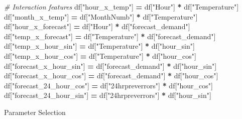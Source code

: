\documentclass[mstat,12pt]{unswthesis}
\newenvironment{Shaded}{\begin{snugshade}}{\end{snugshade}}
\newcommand{\CommentTok}[1]{\textcolor[rgb]{0.56,0.35,0.01}{\textit{#1}}}
\newcommand{\NormalTok}[1]{#1}
\newcommand{\OperatorTok}[1]{\textcolor[rgb]{0.81,0.36,0.00}{\textbf{#1}}}
\newcommand{\StringTok}[1]{\textcolor[rgb]{0.31,0.60,0.02}{#1}}
\begin{document}
\begin{Shaded}
\begin{Highlighting}[]
\CommentTok{\# Interaction features}
\NormalTok{df[}\StringTok{"hour\_x\_temp"}\NormalTok{] }\OperatorTok{=}\NormalTok{ df[}\StringTok{"Hour"}\NormalTok{] }\OperatorTok{*}\NormalTok{ df[}\StringTok{"Temperature"}\NormalTok{]}
\NormalTok{df[}\StringTok{"month\_x\_temp"}\NormalTok{] }\OperatorTok{=}\NormalTok{ df[}\StringTok{"MonthNumb"}\NormalTok{] }\OperatorTok{*}\NormalTok{ df[}\StringTok{"Temperature"}\NormalTok{]}
\NormalTok{df[}\StringTok{"hour\_x\_forecast"}\NormalTok{] }\OperatorTok{=}\NormalTok{ df[}\StringTok{"Hour"}\NormalTok{] }\OperatorTok{*}\NormalTok{ df[}\StringTok{"forecast\_demand"}\NormalTok{]}
\NormalTok{df[}\StringTok{"temp\_x\_forecast"}\NormalTok{] }\OperatorTok{=}\NormalTok{ df[}\StringTok{"Temperature"}\NormalTok{] }\OperatorTok{*}\NormalTok{ df[}\StringTok{"forecast\_demand"}\NormalTok{]}
\NormalTok{df[}\StringTok{"temp\_x\_hour\_sin"}\NormalTok{] }\OperatorTok{=}\NormalTok{ df[}\StringTok{"Temperature"}\NormalTok{] }\OperatorTok{*}\NormalTok{ df[}\StringTok{"hour\_sin"}\NormalTok{]}
\NormalTok{df[}\StringTok{"temp\_x\_hour\_cos"}\NormalTok{] }\OperatorTok{=}\NormalTok{ df[}\StringTok{"Temperature"}\NormalTok{] }\OperatorTok{*}\NormalTok{ df[}\StringTok{"hour\_cos"}\NormalTok{]}
\NormalTok{df[}\StringTok{"forecast\_x\_hour\_sin"}\NormalTok{] }\OperatorTok{=}\NormalTok{ df[}\StringTok{"forecast\_demand"}\NormalTok{] }\OperatorTok{*}\NormalTok{ df[}\StringTok{"hour\_sin"}\NormalTok{]}
\NormalTok{df[}\StringTok{"forecast\_x\_hour\_cos"}\NormalTok{] }\OperatorTok{=}\NormalTok{ df[}\StringTok{"forecast\_demand"}\NormalTok{] }\OperatorTok{*}\NormalTok{ df[}\StringTok{"hour\_cos"}\NormalTok{]}
\NormalTok{df[}\StringTok{"forecast\_24\_hour\_cos"}\NormalTok{] }\OperatorTok{=}\NormalTok{ df[}\StringTok{"24hrpreverrors"}\NormalTok{] }\OperatorTok{*}\NormalTok{ df[}\StringTok{"hour\_cos"}\NormalTok{]}
\NormalTok{df[}\StringTok{"forecast\_24\_hour\_sin"}\NormalTok{] }\OperatorTok{=}\NormalTok{ df[}\StringTok{"24hrpreverrors"}\NormalTok{] }\OperatorTok{*}\NormalTok{ df[}\StringTok{"hour\_sin"}\NormalTok{]}
\end{Highlighting}
\end{Shaded}

\noindent Parameter Selection
\end{document}
